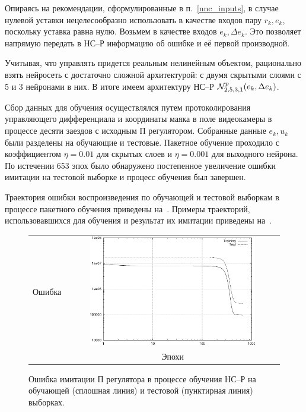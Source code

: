 
Опираясь на рекомендации, сформулированные в п.~\ref{nnc_inputs}, в
случае нулевой уставки нецелесообразно использовать в качестве входов
пару $r_k,e_k$, поскольку уставка равна нулю.  Возьмем в качестве
входов $e_k,\Delta e_k$.  Это позволяет напрямую передать в НС--Р
информацию об ошибке и её первой производной.

Учитывая, что управлять придется реальным нелинейным объектом,
рационально взять нейросеть с достаточно сложной архитектурой: с двумя
скрытыми слоями с 5 и 3 нейронами в них.  В итоге имеем архитектуру
НС--Р $\mathcal{N}^p_{2,5,3,1}(e_k,\Delta e_k)$.

Сбор данных для обучения осуществлялся путем протоколирования
управляющего дифференциала и координаты маяка в поле видеокамеры в
процессе десяти заездов с исходным П регулятором.  Собранные данные
${e_k,u_k}$ были разделены на обучающие и тестовые.  Пакетное обучение
проходило с коэффициентом $\eta=0.01$ для скрытых слоев и $\eta=0.001$
для выходного нейрона.  По истечении 653 эпох было обнаружено
постепенное увеличение ошибки имитации на тестовой выборке и процесс
обучения был завершен.

Траектория ошибки воспроизведения по обучающей и тестовой выборкам в
процессе пакетного обучения приведены
на~.  Примеры траекторий,
использовавшихся для обучения и результат их имитации приведены
на~.

\begin{figure}
\centering
  \begin{tabular}{rc}
    \begin{sideways}
      {\hspace{4cm}\small Ошибка}
    \end{sideways}
    &
    \includegraphics[width=0.8\textwidth,%
                     totalheight=0.35\textheight]{moby_nnc_pretr_training}\\
    & {\small Эпохи} \\
\end{tabular}
\caption{Ошибка имитации П регулятора в процессе обучения НС--Р на
обучающей (сплошная линия) и тестовой (пунктирная линия) выборках.}
\label{fig:moby_nnc_pretr_training}
\end{figure}

